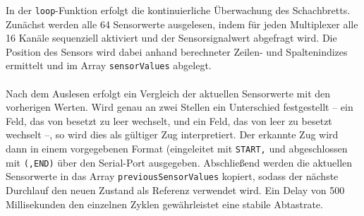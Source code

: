 \documentclass[a4paper]{article}
\begin{document}
In der \texttt{loop}-Funktion erfolgt die kontinuierliche Überwachung des Schachbretts. Zunächst werden alle 64 Sensorwerte ausgelesen, indem für jeden Multiplexer alle 16 Kanäle sequenziell aktiviert und der Sensorsignalwert abgefragt wird. Die Position des Sensors wird dabei anhand berechneter Zeilen- und Spaltenindizes ermittelt und im Array \texttt{sensorValues} abgelegt.\\
\\
Nach dem Auslesen erfolgt ein Vergleich der aktuellen Sensorwerte mit den vorherigen Werten. Wird genau an zwei Stellen ein Unterschied festgestellt – ein Feld, das von \glqq besetzt \grqq zu \glqq leer \grqq wechselt, und ein Feld, das von \glqq leer \grqq zu \glqq besetzt \grqq wechselt –, so wird dies als gültiger Zug interpretiert. Der erkannte Zug wird dann in einem vorgegebenen Format (eingeleitet mit \texttt{START,} und abgeschlossen mit \texttt{(,END)} über den Serial-Port ausgegeben. Abschließend werden die aktuellen Sensorwerte in das Array \texttt{previousSensorValues} kopiert, sodass der nächste Durchlauf den neuen Zustand als Referenz verwendet wird. Ein Delay von 500 Millisekunden den einzelnen Zyklen gewährleistet eine stabile Abtastrate.\\
\\
\end{document}
